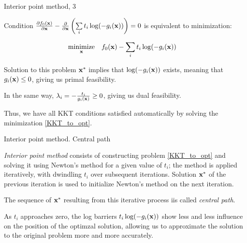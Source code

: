 \documentclass{beamer}
\begin{document}
\begin{frame}{Interior point method, 3}
	\begin{flushleft}
		
		Condition $\frac{\partial f_0(\mathbf{x})}{\partial \mathbf{x}} 
		-
		\frac{\partial}{\partial \mathbf{x}} 
		\left(
		\sum\limits_i 
		t_i \log (- g_i (\mathbf{x})) 
		\right) = 0$ is equivalent to minimization:
		
		
		\begin{equation}
			\label{KKT_to_opt}
			\begin{aligned}
				& \underset{\mathbf{x}}{\text{minimize}}
				& & f_0(\mathbf{x}) - 
				\sum\limits_i t_i \log (- g_i (\mathbf{x})) 
			\end{aligned}
		\end{equation}
		
		Solution to this problem $\mathbf{x}^*$ implies that $\log (- g_i (\mathbf{x}))$ exists, meaning that $g_i (\mathbf{x}) \leq 0$, giving us primal feasibility.
		
		\bigskip
		
		In the same way, $\lambda_i = -\frac{t_i}{g_i(\mathbf{x})} \geq 0$, giving us dual feasibility.
		
		\bigskip
		
		Thus, we have all KKT conditions satisfied automatically by solving the minimization \eqref{KKT_to_opt}.
		
	\end{flushleft}
\end{frame}



\begin{frame}{Interior point method. Central path}
	\begin{flushleft}
		
		\emph{Interior point method} consists of constructing problem \eqref{KKT_to_opt} and solving it using Newton's method for a given value of $t_i$; the method is applied iteratively, with dwindling $t_i$ over subsequent iterations. Solution $\mathbf{x}^*$ of the previous iteration is used to initialize Newton's method on the next iteration.
		
		\bigskip
		
		The sequence of $\mathbf{x}^*$ resulting from this iterative process iis called \emph{central path}. 
		
		\bigskip
		
		As $t_i$ approaches zero, the log barriers $t_i \log (- g_i (\mathbf{x}))$ show less and less influence on the position of the optimzal solution, allowing us to approximate the solution to the original problem more and more accurately.
		
	\end{flushleft}
\end{frame}
\end{document}
